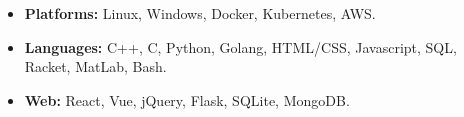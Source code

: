 \begin{itemize}
    \item 
    \textbf{Platforms:} Linux, Windows, Docker, Kubernetes, AWS.
    \item 
    \textbf{Languages:} C++, C, Python, Golang, HTML/CSS, Javascript, SQL, Racket, MatLab, Bash.
    \item 
    \textbf{Web:} React, Vue, jQuery, Flask, SQLite, MongoDB.
\end{itemize}
